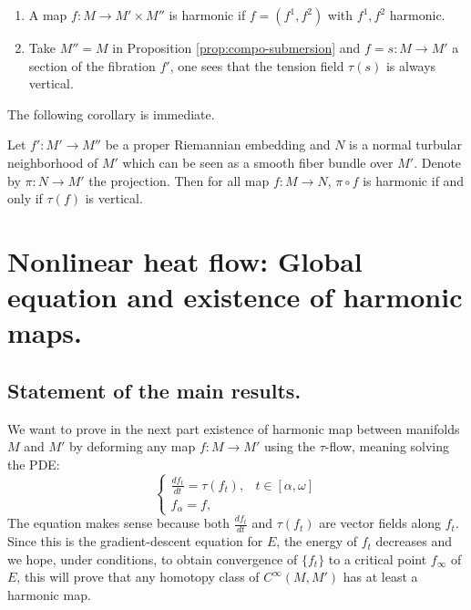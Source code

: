 \begin{exampl}
\begin{enumerate}
\item A map \(f: M \longrightarrow M'\times M''\) is harmonic if \(f=(f^1, f^2)\) with \(f^1, f^2\) harmonic.
\item Take \(M''=M\) in Proposition \ref{prop:compo-submersion} and \(f=s: M \longrightarrow M'\) a
section of the fibration \(f'\), one sees that the tension field \(\tau(s)\) is
always vertical.
\end{enumerate}
\end{exampl}

The following corollary is immediate.
\begin{corollary}
\label{cor:compo-with-submersion}
Let \(f': M' \longrightarrow M''\) be a proper Riemannian embedding and \(N\) is a
normal turbular neighborhood of \(M'\) which can be seen as a smooth fiber bundle over
\(M'\). Denote by \(\pi: N \longrightarrow M'\) the projection. Then for all map \(f:
M \longrightarrow N\), \(\pi\circ f\) is harmonic if and only if \(\tau(f)\) is vertical. 
\end{corollary}

\fi



\section{Nonlinear heat flow: Global equation and existence of harmonic maps.}
\label{sec:org2302b51}
\subsection{Statement of the main results.}
\label{sec:org6c0a559}

We want to prove in the next part existence of harmonic map between manifolds \(M\)
and \(M'\) by deforming any map \(f: M
\longrightarrow M'\) using the \(\tau\)-flow, meaning solving the PDE:
\begin{equation}
\label{eq:loc-heat-flow}
\begin{cases}
\frac{d f_t}{d t} = \tau (f_t),  & t\in [\alpha,\omega] \\
f_\alpha = f, & 
\end{cases}
\end{equation}
The equation makes sense because both \(\frac{d f_t}{d t}\) and \(\tau (f_t)\) are
vector fields along \(f_t\). Since this is the gradient-descent equation for \(E\),
the energy of \(f_t\) decreases and we hope, under conditions, to obtain
convergence of \(\{f_t\}\) to a critical point \(f_\infty\) of \(E\), this will prove
that any homotopy class of \(C^\infty(M,M')\) has at least a harmonic map.

